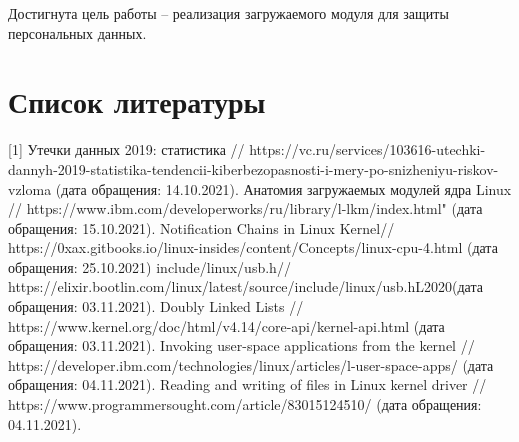 \documentclass[a4paper, 10pt]{article}
\begin{document}
	Достигнута цель работы -- реализация загружаемого модуля для защиты персональных данных. 
\clearpage
\newpage

\section*{Список литературы}
[1] \hspace{2mm} Утечки данных 2019: статистика // https://vc.ru/services/103616-utechki-dannyh-2019-statistika-tendencii-kiberbezopasnosti-i-mery-po-snizheniyu-riskov-vzloma (дата обращения: 14.10.2021).\vspace{3mm}
\newline [2]\hspace{2mm} Анатомия загружаемых модулей ядра Linux // https://www.ibm.com/developerworks/ru/library/l-lkm/index.html" (дата обращения: 15.10.2021).\vspace{3mm}
\newline [3]\hspace{2mm} Notification Chains in Linux Kernel// https://0xax.gitbooks.io/linux-insides/content/Concepts/linux-cpu-4.html (дата обращения: 25.10.2021)\vspace{3mm} 
\newline [4]\hspace{2mm} include/linux/usb.h// https://elixir.bootlin.com/linux/latest/source/include/linux/usb.hL2020(дата обращения: 03.11.2021).\vspace{3mm}
\newline [5]\hspace{2mm} Doubly Linked Lists // https://www.kernel.org/doc/html/v4.14/core-api/kernel-api.html (дата обращения: 03.11.2021).\vspace{3mm}
\newline [6]\hspace{2mm} Invoking user-space applications from the kernel // https://developer.ibm.com/technologies/linux/articles/l-user-space-apps/ (дата обращения: 04.11.2021).\vspace{3mm}
\newline [7]\hspace{2mm} Reading and writing of files in Linux kernel driver // https://www.programmersought.com/article/83015124510/ (дата обращения: 04.11.2021).\vspace{3mm}

\clearpage
\newpage
\end{document}
